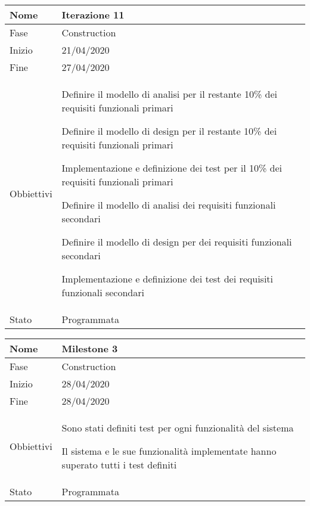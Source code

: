 \begin{center}
\begin{tabular}{ |p{2cm}|p{10cm}|  }
\hline
Nome & Iterazione 11 \\\hline
Fase & Construction \\\hline
Inizio & 21/04/2020 \\\hline
Fine &  27/04/2020  \\\hline
Obbiettivi & 
	\begin{compactitem}
		\item Definire il modello di analisi per il restante 10\% dei requisiti funzionali primari
		\item Definire il modello di design per il restante 10\% dei requisiti funzionali primari
		\item Implementazione e definizione dei test per il 10\% dei requisiti funzionali primari
		
		\item Definire il modello di analisi dei requisiti funzionali secondari
		\item Definire il modello di design per dei requisiti funzionali secondari
		\item Implementazione e definizione dei test dei requisiti funzionali secondari
		
	\end{compactitem}\\\hline
Stato &  Programmata \\\hline
\end{tabular}
\label{table:11}\newline


\begin{tabular}{ |p{2cm}|p{10cm}|  }
\hline
Nome & Milestone 3\\\hline
Fase & Construction \\\hline
Inizio & 28/04/2020 \\\hline
Fine &  28/04/2020 \\\hline
Obbiettivi & 
	\begin{compactitem}
		\item Sono stati definiti test per ogni funzionalità del sistema
		\item Il sistema e le sue funzionalità implementate hanno superato tutti i test definiti
	\end{compactitem}\\\hline
Stato &  Programmata \\\hline
\end{tabular}
\label{table:milestone3}\newline


\end{center}
